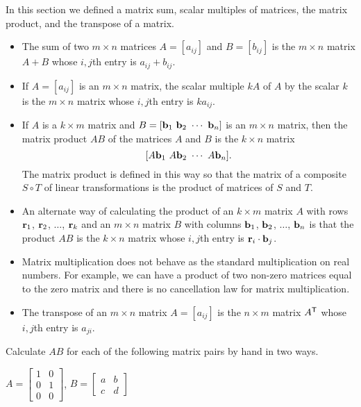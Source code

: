In this section we defined a matrix sum, scalar multiples of matrices, the matrix product, and the transpose of a matrix.
\begin{itemize}
\item The sum of two $m \times n$ matrices $A = [a_{ij}]$ and $B = [b_{ij}]$ is the $m \times n$ matrix $A+B$ whose $i,j$th entry is $a_{ij} + b_{ij}$.
\item If  $A = [a_{ij}]$ is an $m \times n$ matrix, the scalar multiple $kA$ of $A$ by the scalar $k$ is the $m \times n$ matrix whose $i,j$th entry is $ka_{ij}$.
\item If $A$ is a $k \times m$ matrix and $B = [\vb_1 \ \vb_2 \ \cdots \ \vb_n]$ is an $m \times n$ matrix, then the matrix product $AB$ of the matrices $A$ and $B$ is the $k \times n$ matrix
\[[A\vb_1 \ A\vb_2 \ \cdots \ A\vb_n].\]
The matrix product is defined in this way so that the matrix of a composite $S \circ T$ of linear transformations is the product of matrices of $S$ and $T$.
\item An alternate way of calculating the product of an $k \times m$ matrix $A$ with rows $\mathbf{r}_1$, $\mathbf{r}_2$, $\ldots$, $\mathbf{r}_k$  and an $m \times n$ matrix $B$ with columns $\mathbf{b}_1$, $\mathbf{b}_2$, $\ldots$, $\mathbf{b}_n$ is that the product $AB$ is the $k \times n$ matrix whose $i,j$th entry is $\mathbf{r}_i \cdot \mathbf{b}_j$. 
\item Matrix multiplication does not behave as the standard multiplication on real numbers. For example, we can have a product of two non-zero matrices equal to the zero matrix and there is no cancellation law for matrix multiplication.
\item The transpose of an $m \times n$ matrix $A = [a_{ij}]$ is the $n \times m$ matrix $A^{\mathsf{T}}$ whose $i,j$th entry is $a_{ji}$.
\end{itemize}





\be
\item Calculate $AB$ for each of the following matrix pairs by hand in two ways.

\ba
\item $A = \left[ \begin{array}{cc} 1&0\\0&1\\0&0 \end{array} \right]$, $B = \left[ \begin{array}{cc} a&b \\ c&d \end{array} \right]$


